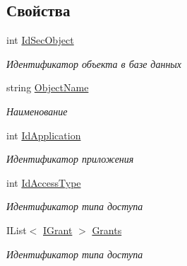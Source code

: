 \subsection*{Свойства}
\begin{DoxyCompactItemize}
\item 
int \hyperlink{interface_security_1_1_interfaces_1_1_model_1_1_i_sec_object_a7dc58f0eda116aa5c872e218f933ec1d}{Id\+Sec\+Object}
\begin{DoxyCompactList}\small\item\em Идентификатор объекта в базе данных \end{DoxyCompactList}\item 
string \hyperlink{interface_security_1_1_interfaces_1_1_model_1_1_i_sec_object_a184445e62d007ad236c4156914682238}{Object\+Name}
\begin{DoxyCompactList}\small\item\em Наименование \end{DoxyCompactList}\item 
int \hyperlink{interface_security_1_1_interfaces_1_1_model_1_1_i_sec_object_a5314cc993a36a607ae57ad5b0f1ef7af}{Id\+Application}
\begin{DoxyCompactList}\small\item\em Идентификатор приложения \end{DoxyCompactList}\item 
int \hyperlink{interface_security_1_1_interfaces_1_1_model_1_1_i_sec_object_a98d1352efd5f354ea09f8739c7c430f4}{Id\+Access\+Type}
\begin{DoxyCompactList}\small\item\em Идентификатор типа доступа \end{DoxyCompactList}\item 
I\+List$<$ \hyperlink{interface_security_1_1_interfaces_1_1_model_1_1_i_grant}{I\+Grant} $>$ \hyperlink{interface_security_1_1_interfaces_1_1_model_1_1_i_sec_object_a3d9e62eacc83d8cdf2b19dc6922a83ad}{Grants}
\begin{DoxyCompactList}\small\item\em Идентификатор типа доступа \end{DoxyCompactList}\item 

\end{DoxyCompactItemize}
